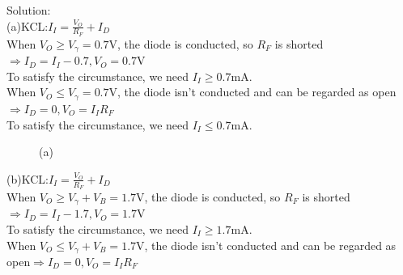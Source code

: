 \documentclass[a4paper,11pt,UTF8]{article}
\begin{document}
\noindent Solution:\\
(a)KCL:$\displaystyle I_I=\frac{V_O}{R_F}+I_D$\\
When $V_O\geq V_\gamma=0.7$V, the diode is conducted, so $R_F$ is shorted $\Rightarrow I_D= I_I-0.7, V_O=0.7$V\\
To satisfy the circumstance, we need $I_I\geq0.7$mA.\\
When $V_O\leq V_\gamma=0.7$V, the diode isn't conducted and can be regarded as open$\Rightarrow I_D= 0, V_O=I_IR_F$\\
To satisfy the circumstance, we need $I_I\leq0.7$mA.\\
\begin{figure}[H]
	\centering  %
	\caption{(a)}
\end{figure}
\noindent(b)KCL:$\displaystyle I_I=\frac{V_O}{R_F}+I_D$\\
When $V_O\geq V_\gamma+V_B=1.7$V, the diode is conducted, so $R_F$ is shorted $\Rightarrow I_D= I_I-1.7, V_O=1.7$V\\
To satisfy the circumstance, we need $I_I\geq1.7$mA.\\
When $V_O\leq V_\gamma+V_B=1.7$V, the diode isn't conducted and can be regarded as open$\Rightarrow I_D= 0, V_O=I_IR_F$\\
\end{document}

